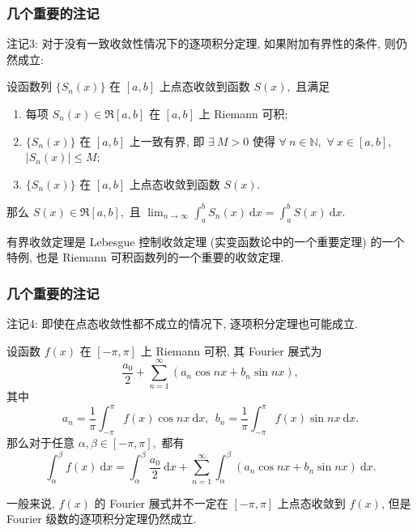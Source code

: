 \begin{frame}
\frametitle{几个重要的注记}

{\color{red}} 注记3: 对于没有一致收敛性情况下的逐项积分定理, 如果附加有界性的条件, 则仍然成立:

\begin{thm}[有界收敛定理]
设函数列 $\{S_n(x)\}$ 在 $[a, b]$ 上点态收敛到函数 $S(x),$ 且满足
\begin{enumerate}
\item 每项 $S_n(x) \in \mathfrak{R}[a, b]$ 在 $[a, b]$ 上 Riemann 可积;
\item $\{S_n(x)\}$ 在 $[a, b]$ 上一致有界, 即 $\exists ~ M > 0$ 使得 $\forall ~ n \in \mathbb{N},$ $\forall ~ x \in [a, b],$ $|S_n(x)| \leqslant M;$
\item $\{S_n(x)\}$ 在 $[a, b]$ 上点态收敛到函数 $S(x).$
\end{enumerate}
那么 $S(x) \in \mathfrak{R}[a, b],$ 且 $\displaystyle \lim_{n\to\infty} \int_a^b S_n(x) ~ \mathrm{d}x = \int_a^b S(x) ~ \mathrm{d}x.$
\end{thm}

\pause

\begin{remark}
有界收敛定理是 Lebesgue 控制收敛定理 (实变函数论中的一个重要定理) 的一个特例, 也是 Riemann 可积函数列的一个重要的收敛定理.
\end{remark}

\end{frame}


\begin{frame}
\frametitle{几个重要的注记}

{\color{red}} 注记4: 即使在点态收敛性都不成立的情况下, 逐项积分定理也可能成立.

\begin{thm}
设函数 $f(x)$ 在 $[-\pi, \pi]$ 上 Riemann 可积, 其 Fourier 展式为
\[
\frac{a_0}{2} + \sum_{n=1}^\infty (a_n \cos nx + b_n \sin nx),
\]
其中
\[
a_n = \frac{1}{\pi} \int_{-\pi}^\pi f(x) \cos nx ~ \mathrm{d}x, ~~ b_n = \frac{1}{\pi} \int_{-\pi}^\pi f(x) \sin nx ~ \mathrm{d}x.
\]
那么对于任意 $\alpha, \beta \in [-\pi, \pi],$ 都有
\[
\int_\alpha^\beta f(x) ~ \mathrm{d}x = \int_\alpha^\beta \frac{a_0}{2} ~ \mathrm{d}x + \sum_{n=1}^\infty \int_\alpha^\beta (a_n \cos nx + b_n \sin nx) ~ \mathrm{d}x.
\]
\end{thm}

一般来说, $f(x)$ 的 Fourier 展式并不一定在 $[-\pi, \pi]$ 上点态收敛到 $f(x)$, 但是 Fourier 级数的逐项积分定理仍然成立.

\end{frame}


